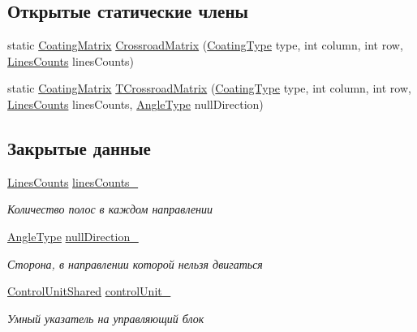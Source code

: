 \subsection*{Открытые статические члены}
\begin{DoxyCompactItemize}
\item 
static \hyperlink{namespacertm_ae3bb29510cfde424975be31866d2486e}{Coating\+Matrix} \hyperlink{classrtm_1_1_crossroad_object_a11e6cc77965034adf630b5ac47ab1222}{Crossroad\+Matrix} (\hyperlink{namespacertm_aecd3929e64cd461eb3555b611f6fad95}{Coating\+Type} type, int column, int row, \hyperlink{namespacertm_a14457f3088a92b86a96686b72d3e4eea}{Lines\+Counts} lines\+Counts)
\item 
static \hyperlink{namespacertm_ae3bb29510cfde424975be31866d2486e}{Coating\+Matrix} \hyperlink{classrtm_1_1_crossroad_object_a24683882ff8728973a1260ff7acc7a02}{T\+Crossroad\+Matrix} (\hyperlink{namespacertm_aecd3929e64cd461eb3555b611f6fad95}{Coating\+Type} type, int column, int row, \hyperlink{namespacertm_a14457f3088a92b86a96686b72d3e4eea}{Lines\+Counts} lines\+Counts, \hyperlink{namespacertm_a69dc82b16a0148c10962caa83d930f89}{Angle\+Type} null\+Direction)
\end{DoxyCompactItemize}
\subsection*{Закрытые данные}
\begin{DoxyCompactItemize}
\item 
\mbox{\label{classrtm_1_1_crossroad_object_a0c335da8c54d6927a9ae1a9a16a908ce}} 
\hyperlink{namespacertm_a14457f3088a92b86a96686b72d3e4eea}{Lines\+Counts} \hyperlink{classrtm_1_1_crossroad_object_a0c335da8c54d6927a9ae1a9a16a908ce}{lines\+Counts\+\_\+}
\begin{DoxyCompactList}\small\item\em Количество полос в каждом направлении \end{DoxyCompactList}\item 
\mbox{\label{classrtm_1_1_crossroad_object_a8e3056ac82578b7d113d26a4926b6258}} 
\hyperlink{namespacertm_a69dc82b16a0148c10962caa83d930f89}{Angle\+Type} \hyperlink{classrtm_1_1_crossroad_object_a8e3056ac82578b7d113d26a4926b6258}{null\+Direction\+\_\+}
\begin{DoxyCompactList}\small\item\em Сторона, в направлении которой нельзя двигаться \end{DoxyCompactList}\item 
\mbox{\label{classrtm_1_1_crossroad_object_a77bfe06c0b30c3837cb92e49ce0a5bca}} 
\hyperlink{namespacertm_a64296d558b2fa02bbf5870afffd61fd9}{Control\+Unit\+Shared} \hyperlink{classrtm_1_1_crossroad_object_a77bfe06c0b30c3837cb92e49ce0a5bca}{control\+Unit\+\_\+}
\begin{DoxyCompactList}\small\item\em Умный указатель на управляющий блок \end{DoxyCompactList}\end{DoxyCompactItemize}

